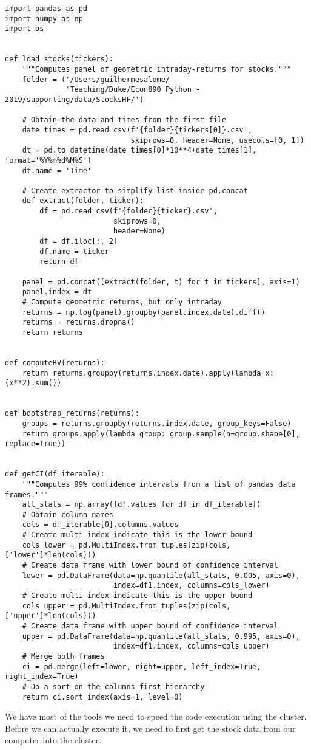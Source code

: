 \documentclass[12pt, a4paper]{article}
\begin{document}
\begin{lstlisting}
import pandas as pd
import numpy as np
import os


def load_stocks(tickers):
    """Computes panel of geometric intraday-returns for stocks."""
    folder = ('/Users/guilhermesalome/'
              'Teaching/Duke/Econ890 Python - 2019/supporting/data/StocksHF/')

    # Obtain the data and times from the first file
    date_times = pd.read_csv(f'{folder}{tickers[0]}.csv',
                             skiprows=0, header=None, usecols=[0, 1])
    dt = pd.to_datetime(date_times[0]*10**4+date_times[1], format='%Y%m%d%M%S')
    dt.name = 'Time'

    # Create extractor to simplify list inside pd.concat
    def extract(folder, ticker):
        df = pd.read_csv(f'{folder}{ticker}.csv',
                         skiprows=0,
                         header=None)
        df = df.iloc[:, 2]
        df.name = ticker
        return df

    panel = pd.concat([extract(folder, t) for t in tickers], axis=1)
    panel.index = dt
    # Compute geometric returns, but only intraday
    returns = np.log(panel).groupby(panel.index.date).diff()
    returns = returns.dropna()
    return returns


def computeRV(returns):
    return returns.groupby(returns.index.date).apply(lambda x: (x**2).sum())


def bootstrap_returns(returns):
    groups = returns.groupby(returns.index.date, group_keys=False)
    return groups.apply(lambda group: group.sample(n=group.shape[0], replace=True))


def getCI(df_iterable):
    """Computes 99% confidence intervals from a list of pandas data frames."""
    all_stats = np.array([df.values for df in df_iterable])
    # Obtain column names
    cols = df_iterable[0].columns.values
    # Create multi index indicate this is the lower bound
    cols_lower = pd.MultiIndex.from_tuples(zip(cols, ['lower']*len(cols)))
    # Create data frame with lower bound of confidence interval
    lower = pd.DataFrame(data=np.quantile(all_stats, 0.005, axis=0),
                         index=df1.index, columns=cols_lower)
    # Create multi index indicate this is the upper bound
    cols_upper = pd.MultiIndex.from_tuples(zip(cols, ['upper']*len(cols)))
    # Create data frame with upper bound of confidence interval
    upper = pd.DataFrame(data=np.quantile(all_stats, 0.995, axis=0),
                         index=df1.index, columns=cols_upper)
    # Merge both frames
    ci = pd.merge(left=lower, right=upper, left_index=True, right_index=True)
    # Do a sort on the columns first hierarchy
    return ci.sort_index(axis=1, level=0)
\end{lstlisting}
We have most of the tools we need to speed the code execution using the cluster.
Before we can actually execute it, we need to first get the stock data from our computer into the cluster.
\end{document}
